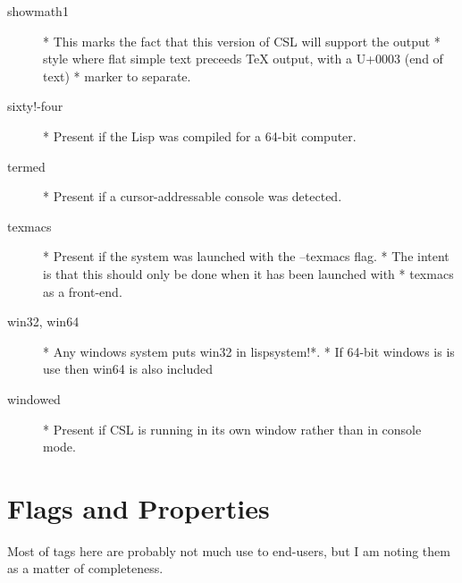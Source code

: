 \documentclass[a4paper,11pt]{article}
\begin{document}
\begin{description}
\item[{\ttfamily showmath1}] 
      * This marks the fact that this version of CSL will support the output
      * style where flat simple text preceeds TeX output, with a U+0003 (end of text)
      * marker to separate.

\item[{\ttfamily  sixty!-four}] 
      * Present if the Lisp was compiled for a 64-bit computer.

\item[{\ttfamily termed}] 
      * Present if a cursor-addressable console was detected.

\item[{\ttfamily texmacs}] 
      * Present if the system was launched with the {\ttfamily --texmacs} flag.
      * The intent is that this should only be done when it has been launched with
      * texmacs as a front-end.

\item[{\ttfamily win32}, {\ttfamily win64}] 
      * Any windows system puts {\ttfamily win32} in {\ttfamily lispsystem!*}.
      * If 64-bit windows is is use then {\ttfamily win64} is also included

\item[{\ttfamily windowed}] 
      * Present if CSL is running in its own window rather than in console mode.

\end{description} %

\section{Flags and Properties}
  
Most of tags here are probably not much use to end-users, but I am
noting them as a matter of completeness.
  
\end{document}
